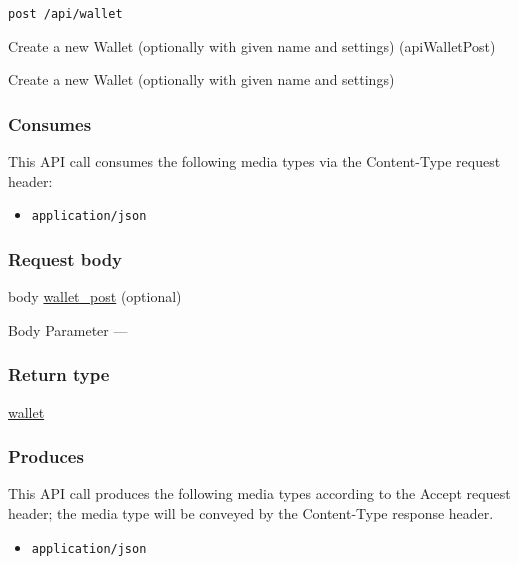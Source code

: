 \protect\hypertarget{apiWalletPost}{}{}

\begin{verbatim}
post /api/wallet
\end{verbatim}

Create a new Wallet (optionally with given name and settings)
({apiWalletPost})

Create a new Wallet (optionally with given name and settings)

\hypertarget{consumes-29}{%
\subsubsection{Consumes}\label{consumes-29}}

This API call consumes the following media types via the {Content-Type}
request header:

\begin{itemize}
\tightlist
\item
  \texttt{application/json}
\end{itemize}

\hypertarget{request-body-29}{%
\subsubsection{Request body}\label{request-body-29}}

body \protect\hyperlink{wallet_post}{wallet\_post} (optional)

{Body Parameter} ---

\hypertarget{return-type-68}{%
\subsubsection{Return type}\label{return-type-68}}

\protect\hyperlink{wallet}{wallet}

\hypertarget{produces-83}{%
\subsubsection{Produces}\label{produces-83}}

This API call produces the following media types according to the
{Accept} request header; the media type will be conveyed by the
{Content-Type} response header.

\begin{itemize}
\tightlist
\item
  \texttt{application/json}
\end{itemize}

